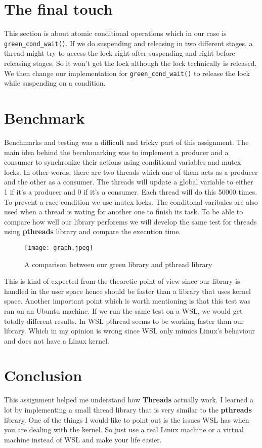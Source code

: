 \documentclass[a4paper,10pt]{article}
\begin{document}
\section*{The final touch}
This section is about atomic conditional operations which in our case
is          \texttt{green\_cond\_wait()}. If we do suspending and releasing in two different stages, a thread might try to access the lock right after suspending and right before releasing stages. So it won't get the lock although the lock technically is released.
We then change our implementation for \texttt{green\_cond\_wait()} to release the lock while suspending on a condition.

\section*{Benchmark}
Benchmarks and testing was a difficult and tricky part of this assignment. The main idea behind the becnhmarking was to implement a producer and a consumer to synchronize their actions using conditional variables and mutex locks. In other words, there are two threads which one of them acts as a producer and the other as a consumer. The threads will update a global variable to either 1 if it's a producer and 0 if it's a consumer. Each thread will do this 50000 times. To prevent a race condition we use mutex locks. The conditonal varibales are also used when a thread is wating for another one to finish its task. To be able to compare how well our library perforems we will develop the same test for threads using \textbf{pthreads} library and compare the execution time.

\begin{figure}[htp]
    \centering
    \texttt{[image: graph.jpeg]}
    \caption{A comparison between our green library and pthread library}
    \label{fig:graph}
\end{figure}

This is kind of expected from the theoretic point of view since our library is handled in the user space hence should be faster than a library that uses kernel space.
Another important point which is worth mentioning is that this test was ran on an Ubuntu machine. If we run the same test on a WSL, we would get totally different results. In WSL pthread seems to be working faster than our library. Which in my opinion is wrong since WSL only mimics Linux's behaviour and does not have a Linux kernel.

\section*{Conclusion}
This assignment helped me understand how \textbf{Threads} actually work. I learned a lot by implementing a small thread library that is very similar to the \textbf{pthreads} library. One of the things I would like to point out is the issues WSL has when you are dealing with the kernel. So just use a real Linux machine or a virtual machine instead of WSL and make your life easier.
\end{document}
